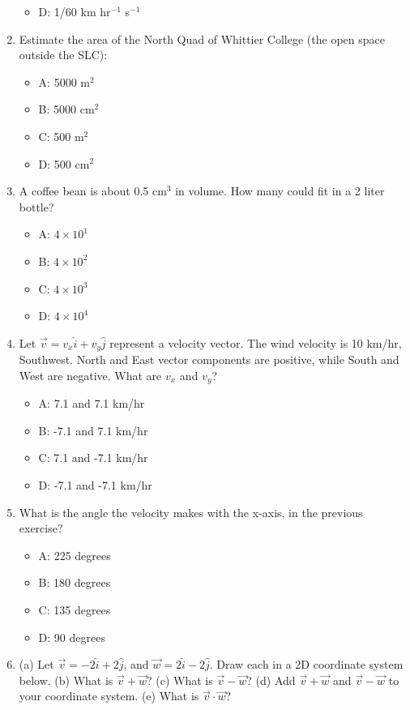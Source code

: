 \documentclass[10pt]{article}
\begin{document}
\begin{enumerate}
\begin{itemize}
\item D: 1/60 km hr$^{-1}$ s$^{-1}$
\end{itemize}
\item Estimate the area of the North Quad of Whittier College (the open space outside the SLC):
\begin{itemize}
\item A: 5000 m$^2$
\item B: 5000 cm$^2$
\item C: 500 m$^2$
\item D: 500 cm$^2$
\end{itemize} \vspace{1cm}
\item A coffee bean is about 0.5 cm$^3$ in volume.  How many could fit in a 2 liter bottle?
\begin{itemize}
\item A: $4\times 10^{1}$
\item B: $4\times 10^{2}$
\item C: $4\times 10^{3}$
\item D: $4\times 10^{4}$
\end{itemize}
\item Let $\vec{v} = v_x \hat{i} + v_y \hat{j}$ represent a velocity vector.  The wind velocity is 10 km/hr, Southwest.  North and East vector components are positive, while South and West are negative.  What are $v_x$ and $v_y$?
\begin{itemize}
\item A: 7.1 and 7.1 km/hr
\item B: -7.1 and 7.1 km/hr
\item C: 7.1 and -7.1 km/hr
\item D: -7.1 and -7.1 km/hr
\end{itemize}
\item What is the angle the velocity makes with the x-axis, in the previous exercise?
\begin{itemize}
\item A: 225 degrees
\item B: 180 degrees
\item C: 135 degrees
\item D: 90 degrees
\end{itemize}
\item (a) Let $\vec{v} = -2\hat{i} + 2\hat{j}$, and $\vec{w} = 2\hat{i} - 2\hat{j}$.  Draw each in a 2D coordinate system below. (b) What is $\vec{v} + \vec{w}$?  (c) What is $\vec{v} - \vec{w}$? (d) Add $\vec{v} + \vec{w}$ and $\vec{v} - \vec{w}$ to your coordinate system. (e) What is $\vec{v} \cdot \vec{w}$? \\ \vspace{2.5cm}
\end{enumerate}
\end{document}
